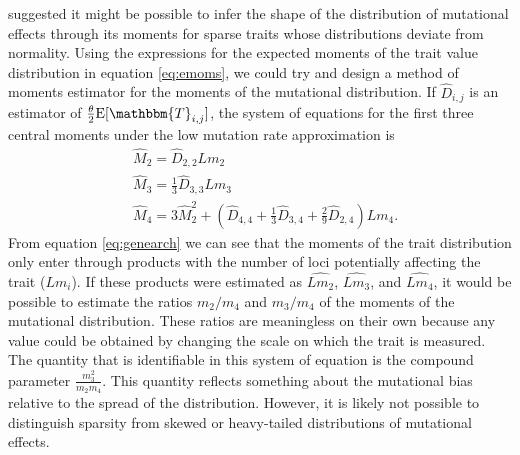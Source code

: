 \citet{Schraiber2015} suggested it might be possible to infer the shape of the
distribution of mutational effects through its moments for sparse traits whose
distributions deviate from normality. Using the expressions for the expected
moments of the trait value distribution in equation \eqref{eq:emoms}, we could
try and design a method of moments estimator for the moments of the mutational
distribution. If $\hat{D}_{i,j}$ is an estimator of $\T \E[\mathbbm{T}_{i,j}]$,
the system of equations for the first three central moments under the low
mutation rate approximation is
\begin{align}
\label{eq:genearch}
  &\widehat{M}_2 = \widehat{D}_{2,2}Lm_2 \nonumber \\
  &\widehat{M}_3 = \frac{1}{3}\widehat{D}_{3,3}Lm_3 \nonumber \\
  &\widehat{M}_4 = 3\widehat{M}_2^2 + (\widehat{D}_{4,4} + \frac{1}{3} \widehat{D}_{3,4} + \frac{2}{9} \widehat{D}_{2,4})Lm_4.
\end{align}
From equation \eqref{eq:genearch} we can see that the moments of the trait
distribution only enter through products with the number of loci potentially
affecting the trait ($Lm_i$). If these products were estimated as
$\widehat{Lm_2}$, $\widehat{Lm_3}$, and $\widehat{Lm_4}$, it would be possible
to estimate the ratios $m_2/m_4$ and $m_3/m_4$ of the moments of the mutational
distribution. These ratios are meaningless on their own because any value could
be obtained by changing the scale on which the trait is measured. The quantity
that is identifiable in this system of equation is the compound parameter
$\frac{m_3^2}{m_2m_4}$. This quantity reflects something about the mutational
bias relative to the spread of the distribution. However, it is likely not
possible to distinguish sparsity from skewed or heavy-tailed distributions of
mutational effects. 

